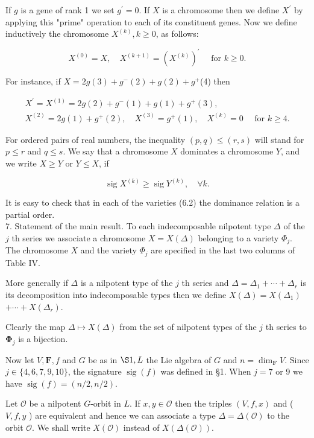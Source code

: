 \documentclass[10pt]{article}
\begin{document}
If $g$ is a gene of rank 1 we set $g^{\prime}=0$. If $X$ is a chromosome then we define $X^{\prime}$ by applying this "prime" operation to each of its constituent genes. Now we define inductively the chromosome $X^{(k)}, k \geqslant 0$, as follows:

$$
X^{(0)}=X, \quad X^{(k+1)}=\left(X^{(k)}\right)^{\prime} \quad \text { for } k \geqslant 0 .
$$

For instance, if $X=2 g(3)+g^{-}(2)+g(2)+g^{+}$(4) then

$$
\begin{gathered}
X^{\prime}=X^{(1)}=2 g(2)+g^{-}(1)+g(1)+g^{+}(3), \\
X^{(2)}=2 g(1)+g^{+}(2), \quad X^{(3)}=g^{+}(1), \quad X^{(k)}=0 \quad \text { for } k \geqslant 4 .
\end{gathered}
$$

For ordered pairs of real numbers, the inequality $(p, q) \leqslant(r, s)$ will stand for $p \leqslant r$ and $q \leqslant s$. We say that a chromosome $X$ dominates a chromosome $Y$, and we write $X \geqslant Y$ or $Y \leqslant X$, if

$$
\operatorname{sig} X^{(k)} \geqslant \operatorname{sig} Y^{(k)}, \quad \forall k .
$$

It is easy to check that in each of the varieties (6.2) the dominance relation is a partial order.\\
7. Statement of the main result. To each indecomposable nilpotent type $\Delta$ of the $j$ th series we associate a chromosome $X=X(\Delta)$ belonging to a variety $\Phi_{j}$. The chromosome $X$ and the variety $\Phi_{j}$ are specified in the last two columns of Table IV.

More generally if $\Delta$ is a nilpotent type of the $j$ th series and $\Delta=\Delta_{1}+\cdots+\Delta_{r}$ is its decomposition into indecomposable types then we define $X(\Delta)=X\left(\Delta_{1}\right)$ $+\cdots+X\left(\Delta_{r}\right)$.

Clearly the map $\Delta \mapsto X(\Delta)$ from the set of nilpotent types of the $j$ th series to $\boldsymbol{\Phi}_{j}$ is a bijection.

Now let $V, \mathbf{F}, f$ and $G$ be as in $\S 1, L$ the Lie algebra of $G$ and $n=\operatorname{dim}_{\mathbf{F}} V$. Since $j \in\{4,6,7,9,10\}$, the signature $\operatorname{sig}(f)$ was defined in §1. When $j=7$ or 9 we have $\operatorname{sig}(f)=(n / 2, n / 2)$.

Let $\mathcal{O}$ be a nilpotent $G$-orbit in $L$. If $x, y \in \mathcal{O}$ then the triples $(V, f, x)$ and ( $V, f, y$ ) are equivalent and hence we can associate a type $\Delta=\Delta(\mathcal{O})$ to the orbit $\mathcal{O}$. We shall write $X(\mathcal{O})$ instead of $X(\Delta(\mathcal{O}))$.
\end{document}
